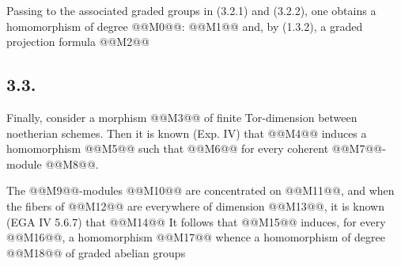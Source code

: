 
Passing to the associated graded groups in (3.2.1) and (3.2.2), one obtains a homomorphism of degree @@M0@@:
@@M1@@
and, by (1.3.2), a graded projection formula
@@M2@@

\subsection*{3.3.}
Finally, consider a morphism @@M3@@ of finite Tor-dimension between noetherian schemes. Then it is known (Exp. IV) that @@M4@@ induces a homomorphism
@@M5@@
such that
@@M6@@
for every coherent @@M7@@-module @@M8@@.

The @@M9@@-modules @@M10@@ are concentrated on @@M11@@, and when the fibers of @@M12@@ are everywhere of dimension @@M13@@, it is known (EGA IV 5.6.7) that
@@M14@@
It follows that @@M15@@ induces, for every @@M16@@, a homomorphism
@@M17@@
whence a homomorphism of degree @@M18@@ of graded abelian groups

